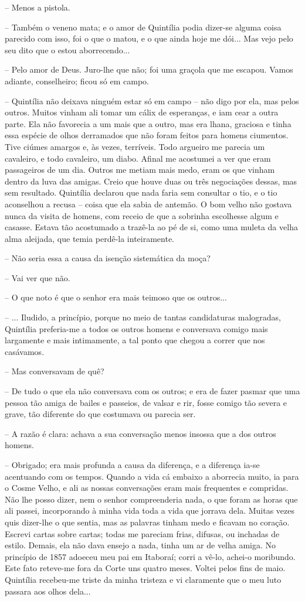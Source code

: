 -- Menos a pistola.

-- Também o veneno mata; e o amor de Quintília podia dizer-se alguma
coisa parecido com isso, foi o que o matou, e o que ainda hoje me dói...
Mas vejo pelo seu dito que o estou aborrecendo...

-- Pelo amor de Deus. Juro-lhe que não; foi uma graçola que me escapou.
Vamos adiante, conselheiro; ficou só em campo.

-- Quintília não deixava ninguém estar só em campo -- não digo por ela,
mas pelos outros. Muitos vinham ali tomar um cálix de esperanças, e iam
cear a outra parte. Ela não favorecia a um mais que a outro, mas era
lhana, graciosa e tinha essa espécie de olhos derramados que não foram
feitos para homens ciumentos. Tive ciúmes amargos e, às vezes,
terríveis. Todo argueiro me parecia um cavaleiro, e todo cavaleiro, um
diabo. Afinal me acostumei a ver que eram passageiros de um dia. Outros
me metiam mais medo, eram os que vinham dentro da luva das amigas. Creio
que houve duas ou três negociações dessas, mas sem resultado. Quintília
declarou que nada faria sem consultar o tio, e o tio aconselhou a recusa
-- coisa que ela sabia de antemão. O bom velho não gostava nunca da
visita de homens, com receio de que a sobrinha escolhesse algum e
casasse. Estava tão acostumado a trazê-la ao pé de si, como uma muleta
da velha alma aleijada, que temia perdê-la inteiramente.

-- Não seria essa a causa da isenção sistemática da moça?

-- Vai ver que não.

-- O que noto é que o senhor era mais teimoso que os outros...

-- ... Iludido, a princípio, porque no meio de tantas candidaturas
malogradas, Quintília preferia-me a todos os outros homens e conversava
comigo mais largamente e mais intimamente, a tal ponto que chegou a
correr que nos casávamos.

-- Mas conversavam de quê?

-- De tudo o que ela não conversava com os outros; e era de fazer pasmar
que uma pessoa tão amiga de bailes e passeios, de valsar e rir, fosse
comigo tão severa e grave, tão diferente do que costumava ou parecia
ser.

-- A razão é clara: achava a sua conversação menos insossa que a dos
outros homens.

-- Obrigado; era mais profunda a causa da diferença, e a diferença ia-se
acentuando com os tempos. Quando a vida cá embaixo a aborrecia muito, ia
para o Cosme Velho, e ali as nossas conversações eram mais frequentes e
compridas. Não lhe posso dizer, nem o senhor compreenderia nada, o que
foram as horas que ali passei, incorporando à minha vida toda a vida que
jorrava dela. Muitas vezes quis dizer-lhe o que sentia, mas as palavras
tinham medo e ficavam no coração. Escrevi cartas sobre cartas; todas me
pareciam frias, difusas, ou inchadas de estilo. Demais, ela não dava
ensejo a nada, tinha um ar de velha amiga. No princípio de 1857 adoeceu
meu pai em Itaboraí; corri a vê-lo, achei-o moribundo. Este fato
reteve-me fora da Corte uns quatro meses. Voltei pelos fins de maio.
Quintília recebeu-me triste da minha tristeza e vi claramente que o meu
luto passara aos olhos dela...

